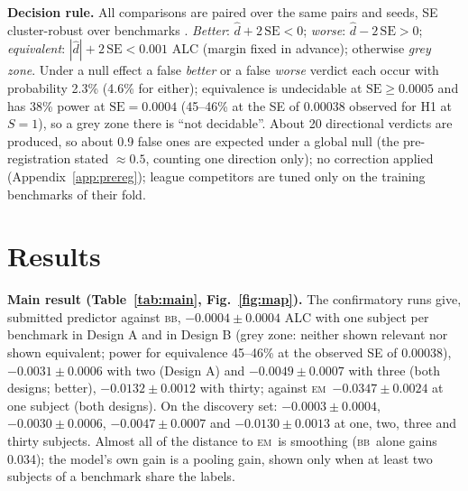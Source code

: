 \documentclass{article}
\newcommand{\BB}{\textsc{bb}}
\newcommand{\EM}{\textsc{em}}
\begin{document}
\textbf{Decision rule.} All comparisons are paired over the same pairs and seeds, SE cluster-robust over benchmarks
\citep{cameron2015cluster}. \emph{Better}: $\hat d + 2\,\mathrm{SE} < 0$; \emph{worse}: $\hat d - 2\,\mathrm{SE} > 0$;
\emph{equivalent}: $|\hat d| + 2\,\mathrm{SE} < 0.001$ ALC (margin fixed in advance); otherwise \emph{grey zone}. Under
a null effect a false \emph{better} or a false \emph{worse} verdict each occur with probability 2.3\% (4.6\% for either);
equivalence is undecidable at $\mathrm{SE} \ge 0.0005$ and has 38\% power at $\mathrm{SE} = 0.0004$ (45--46\% at the
SE of 0.00038 observed for H1 at $S = 1$), so a grey zone there is ``not decidable''. About 20 directional verdicts are produced, so about 0.9 false ones are expected
under a global null (the pre-registration stated $\approx 0.5$, counting one direction only); no correction applied
(Appendix~\ref{app:prereg}); league competitors are tuned only on the training benchmarks of their fold.

\section{Results}
\label{sec:results}



\textbf{Main result (Table~\ref{tab:main}, Fig.~\ref{fig:map}).} The confirmatory runs give, submitted predictor
against \BB, \mbox{$-0.0004 \pm 0.0004$} ALC with one subject per benchmark in Design A and in Design B (grey zone: neither
shown relevant nor shown equivalent; power for equivalence 45--46\% at the observed SE of 0.00038), \mbox{$-0.0031 \pm 0.0006$}
with two (Design A) and \mbox{$-0.0049 \pm 0.0007$} with three (both designs; better), \mbox{$-0.0132 \pm 0.0012$} with thirty;
against \EM\ \mbox{$-0.0347 \pm 0.0024$} at one subject (both designs). On the discovery set: \mbox{$-0.0003 \pm 0.0004$}, \mbox{$-0.0030 \pm 0.0006$}, \mbox{$-0.0047 \pm 0.0007$} and \mbox{$-0.0130 \pm 0.0013$} at one, two, three and thirty subjects. Almost all of the distance to \EM\ is smoothing (\BB\ alone gains 0.034); the
model's own gain is a pooling gain, shown only when at least two subjects of a benchmark share the labels.


\end{document}
